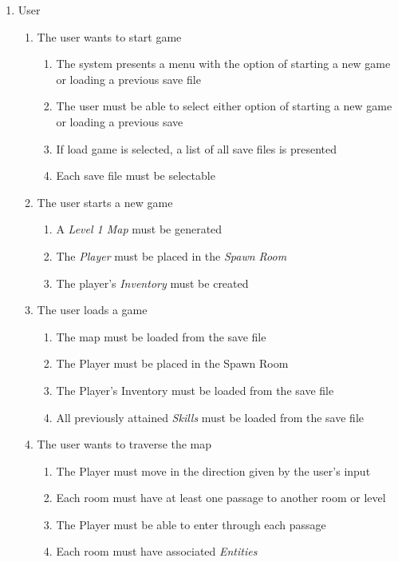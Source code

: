 \documentclass[12pt, titlepage]{article}
\begin{document}
\begin{enumerate}[{VP}1.]
  \item User 
  \begin{enumerate}[{BE1}.1]
    \item The user wants to start game
    \begin{enumerate}
      \item The system presents a menu with the option of starting a new game or loading a previous save file
      \item The user must be able to select either option of starting a new game or loading a previous save
      \item If load game is selected, a list of all save files is presented
      \item Each save file must be selectable
    \end{enumerate}
    \item The user starts a new game
    \begin{enumerate}
      \item A \textit{Level 1 Map} must be generated
      \item The \textit{Player} must be placed in the \textit{Spawn Room}
      \item The player's \textit{Inventory} must be created
    \end{enumerate}
    \item The user loads a game
    \begin{enumerate}
      \item The map must be loaded from the save file
      \item The Player must be placed in the Spawn Room
      \item The Player's Inventory must be loaded from the save file
      \item All previously attained \textit{Skills} must be loaded from the save file
    \end{enumerate}
    \item The user wants to traverse the map
    \begin{enumerate}
      \item The Player must move in the direction given by the user's input
      \item Each room must have at least one passage to another room or level
      \item The Player must be able to enter through each passage
      \item Each room must have associated \textit{Entities}

\end{enumerate}
\end{enumerate}
\end{enumerate}
\end{document}
